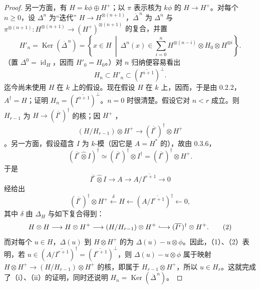 \begin{proof}
另一方面，有 $H=k\phi\oplus H^+$；以 $\pi$ 表示核为 $k\phi$ 的 $H\to H^+$。对每个 $n\geq0$，设 $\Delta^n$ 为“迭代” $H\to H^{\otimes(n+1)}$，$\overline\Delta^{\,n}$ 为 $\Delta^n$ 与 $\pi^{\otimes(n+1)}:H^{\otimes(n+1)}\to(H^+)^{\otimes(n+1)}$ 的复合，并置
\[
 H'_n=\operatorname{Ker}(\overline\Delta^{\,n})
 =\left\{x\in H\ \middle|\ \Delta^n(x)\in\sum_{i=0}^n H^{\otimes(n-i)}\otimes H_0\otimes H^{\otimes i}\right\}.
\]
（置 $\Delta^0=\operatorname{id}_H$，因而 $H'_0=H_0$。）对 $n$ 归纳便容易看出
\[
 H_n\subset H'_n\subset(\overline{I^{n+1}})^\perp.\tag{$*$}
\]
迄今尚未使用 $H$ 在 $k$ 上的假设。现在假设 $H$ 在 $k$ 上，因而，于是由 0.2.2，$A^\dagger=H$；证明 $H_n=(\overline{I^{n+1}})^\perp$。$n=0$ 时很清楚。假设它对 $n<r$ 成立。则 $H_{r-1}$ 为 $H\to(\overline{I^r})^\dagger$ 的核；因 $H^+$ ，
\[
 (H/H_{r-1})\otimes H^+\longrightarrow(\overline{I^r})^\dagger\otimes H^+
\]
。另一方面，假设蕴含 $I$ 为 $k$-模（因它是 $A=H^*$ 的），故由 0.3.6，
\[
 (\overline{I^r}\widehat\otimes I)^\dagger\simeq(\overline{I^r})^\dagger\otimes I^\dagger
 =(\overline{I^r})^\dagger\otimes H^+.
\]
于是
\[
 \overline{I^r}\widehat\otimes I\longrightarrow A\longrightarrow A/\overline{I^{r+1}}\longrightarrow0
\]
经给出
\[
 (\overline{I^r})^\dagger\otimes H^+\xleftarrow{\delta}H\longleftarrow(A/\overline{I^{r+1}})^\dagger\longleftarrow0,\tag{1}
\]
其中 $\delta$ 由 $\Delta_H$ 与如下复合得到：
\[
 H\otimes H\longrightarrow H\otimes H^+\longrightarrow(H/H_{r-1})\otimes H^+
 \lhook\joinrel\longrightarrow(\overline{I^r})^\dagger\otimes H^+.\tag{2}
\]
而对每个 $u\in H$，$\Delta(u)$ 到 $H\otimes H^+$ 的为 $\Delta(u)-u\otimes\phi$。因此，（1）、（2）表明，若 $u\in(A/\overline{I^{r+1}})^\dagger=(\overline{I^{r+1}})^\perp$，则 $\Delta(u)-u\otimes\phi$ 属于映射 $H\otimes H^+\to(H/H_{r-1})\otimes H^+$ 的核，即属于 $H_{r-1}\otimes H^+$，所以 $u\in H_r$。这就完成了（i）、（ii）的证明，同时还说明 $H_n=\operatorname{Ker}(\overline\Delta^{\,n})$。


\end{proof}
